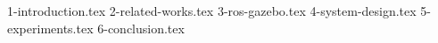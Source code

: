 {1-introduction.tex}
{2-related-works.tex}
{3-ros-gazebo.tex}
{4-system-design.tex}
{5-experiments.tex}
{6-conclusion.tex}
